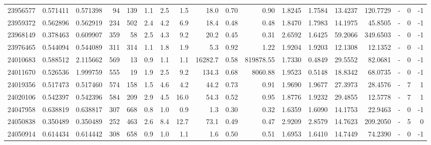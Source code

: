 \begin{tabular}{rrrrrrrrrrrrrrrlrr}
  23956577 & 0.571411 &   0.571398 &   94 &  139 &      1.1 &      2.5 &     1.5 &     18.0 &       0.70 &        0.90 &  1.8245 &  1.7584 &   13.4237 &  120.7729 &             - &        0 &         -1 \\
  23959372 & 0.562896 &   0.562919 &  234 &  502 &      2.4 &      4.2 &     6.9 &     18.4 &       0.48 &        0.48 &  1.8470 &  1.7983 &   14.1975 &   45.8505 &             - &        0 &         -1 \\
  23968149 & 0.378463 &   0.609907 &  359 &   58 &      2.5 &      4.3 &     9.2 &     20.2 &       0.45 &        0.31 &  2.6592 &  1.6425 &   59.2066 &  349.6503 &             - &        0 &         -1 \\
  23976465 & 0.544094 &   0.544089 &  311 &  314 &      1.1 &      1.8 &     1.9 &      5.3 &       0.92 &        1.22 &  1.9204 &  1.9203 &   12.1308 &   12.1352 &             - &        0 &         -1 \\
  24010683 & 0.588512 &   2.115662 &  569 &   13 &      0.9 &      1.1 &     1.1 &  16282.7 &       0.58 &   819878.55 &  1.7330 &  0.4849 &   29.5552 &   82.0681 &             - &        0 &         -1 \\
  24011670 & 0.526536 &   1.999759 &  555 &   19 &      1.9 &      2.5 &     9.2 &    134.3 &       0.68 &     8060.88 &  1.9523 &  0.5148 &   18.8342 &   68.0735 &             - &        0 &         -1 \\
  24019356 & 0.517473 &   0.517460 &  574 &  158 &      1.5 &      4.6 &     4.2 &     44.2 &       0.73 &        0.91 &  1.9690 &  1.9677 &   27.3973 &   28.4576 &             - &        7 &          1 \\
  24020106 & 0.542397 &   0.542396 &  584 &  209 &      2.9 &      4.5 &    16.0 &     54.3 &       0.52 &        0.95 &  1.8776 &  1.9232 &   29.4855 &   12.5778 &             - &        7 &          1 \\
  24047958 & 0.638819 &   0.638817 &  307 &  668 &      0.8 &      1.0 &     0.9 &      1.3 &       0.30 &        0.32 &  1.6359 &  1.6090 &   14.1753 &   22.9463 &             - &        0 &         -1 \\
  24050838 & 0.350489 &   0.350489 &  252 &  463 &      2.6 &      8.4 &    12.7 &     73.1 &       0.49 &        0.47 &  2.9209 &  2.8579 &   14.7623 &  209.2050 &             - &        5 &          0 \\
  24050914 & 0.614434 &   0.614442 &  308 &  658 &      0.9 &      1.0 &     1.1 &      1.6 &       0.50 &        0.51 &  1.6953 &  1.6410 &   14.7449 &   74.2390 &             - &        0 &         -1 \\

\end{tabular}
